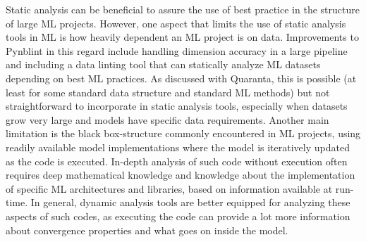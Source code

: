 \documentclass{article}
\begin{document}
Static analysis can be beneficial to assure the use of best practice in the structure of large ML projects. However, one aspect that limits the use of static analysis tools in ML is how heavily dependent an ML project is on data. Improvements to Pynblint in this regard include handling dimension accuracy in a large pipeline and including a data linting tool that can statically analyze ML datasets depending on best ML practices. As discussed with Quaranta, this is possible (at least for some standard data structure and standard ML methods) but not straightforward to incorporate in static analysis tools, especially when datasets grow very large and models have specific data requirements. Another main limitation is the black box-structure commonly encountered in ML projects, using readily available model implementations where the model is iteratively updated as the code is executed. In-depth analysis of such code without execution often requires deep mathematical knowledge and knowledge about the implementation of specific ML architectures and libraries, based on information available at run-time. In general, dynamic analysis tools are better equipped for analyzing these aspects of such codes, as executing the code can provide a lot more information about convergence properties and what goes on inside the model. 
\end{document}
